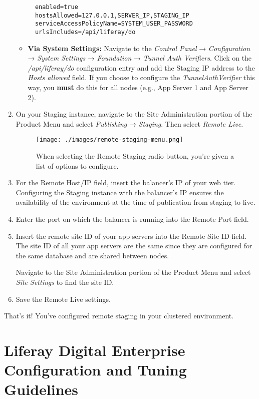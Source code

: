 \begin{enumerate}
\begin{itemize}
\begin{verbatim}
  enabled=true
  hostsAllowed=127.0.0.1,SERVER_IP,STAGING_IP
  serviceAccessPolicyName=SYSTEM_USER_PASSWORD
  urlsIncludes=/api/liferay/do
\end{verbatim}
  \item
    \textbf{Via System Settings:} Navigate to the \emph{Control Panel} →
    \emph{Configuration} → \emph{System Settings} → \emph{Foundation} →
    \emph{Tunnel Auth Verifiers}. Click on the \emph{/api/liferay/do}
    configuration entry and add the Staging IP address to the
    \emph{Hosts allowed} field. If you choose to configure the
    \emph{TunnelAuthVerifier} this way, you \textbf{must} do this for
    all nodes (e.g., App Server 1 and App Server 2).
  \end{itemize}
\item
  On your Staging instance, navigate to the Site Administration portion
  of the Product Menu and select \emph{Publishing} → \emph{Staging}.
  Then select \emph{Remote Live}.

  \begin{figure}
  \centering
  \texttt{[image: ./images/remote-staging-menu.png]}
  \caption{When selecting the Remote Staging radio button, you're given
  a list of options to configure.}
  \end{figure}
\item
  For the Remote Host/IP field, insert the balancer's IP of your web
  tier. Configuring the Staging instance with the balancer's IP ensures
  the availability of the environment at the time of publication from
  staging to live.
\item
  Enter the port on which the balancer is running into the Remote Port
  field.
\item
  Insert the remote site ID of your app servers into the Remote Site ID
  field. The site ID of all your app servers are the same since they are
  configured for the same database and are shared between nodes.

  Navigate to the Site Administration portion of the Product Menu and
  select \emph{Site Settings} to find the site ID.
\item
  Save the Remote Live settings.
\end{enumerate}

That's it! You've configured remote staging in your clustered
environment.

\chapter{Liferay Digital Enterprise Configuration and Tuning
Guidelines}\label{liferay-digital-enterprise-configuration-and-tuning-guidelines}

